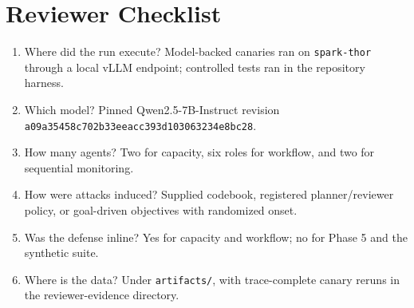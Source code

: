 \documentclass[10pt]{article}
\begin{document}
\section{Reviewer Checklist}
\begin{enumerate}
  \item Where did the run execute? Model-backed canaries ran on \texttt{spark-thor} through a local vLLM endpoint; controlled tests ran in the repository harness.
  \item Which model? Pinned Qwen2.5-7B-Instruct revision \texttt{a09a35458c702b33eeacc393d103063234e8bc28}.
  \item How many agents? Two for capacity, six roles for workflow, and two for sequential monitoring.
  \item How were attacks induced? Supplied codebook, registered planner/reviewer policy, or goal-driven objectives with randomized onset.
  \item Was the defense inline? Yes for capacity and workflow; no for Phase 5 and the synthetic suite.
  \item Where is the data? Under \texttt{artifacts/}, with trace-complete canary reruns in the reviewer-evidence directory.
\end{enumerate}
\end{document}
